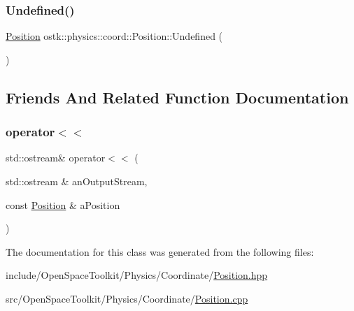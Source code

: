 \mbox{\label{classostk_1_1physics_1_1coord_1_1_position_a9d9c2e5b2a72f978192eb9e3a7ce7d8b}} 
\subsubsection{\texorpdfstring{Undefined()}{Undefined()}}
{\footnotesize\ttfamily \hyperlink{classostk_1_1physics_1_1coord_1_1_position}{Position} ostk\+::physics\+::coord\+::\+Position\+::\+Undefined (\begin{DoxyParamCaption}{ }\end{DoxyParamCaption})\hspace{0.3cm}{\ttfamily [static]}}



\subsection{Friends And Related Function Documentation}
\mbox{\label{classostk_1_1physics_1_1coord_1_1_position_aab9f362c268370239ccad2c8a6d0eaee}} 
\subsubsection{\texorpdfstring{operator$<$$<$}{operator<<}}
{\footnotesize\ttfamily std\+::ostream\& operator$<$$<$ (\begin{DoxyParamCaption}\item[{std\+::ostream \&}]{an\+Output\+Stream,  }\item[{const \hyperlink{classostk_1_1physics_1_1coord_1_1_position}{Position} \&}]{a\+Position }\end{DoxyParamCaption})\hspace{0.3cm}{\ttfamily [friend]}}



The documentation for this class was generated from the following files\+:\begin{DoxyCompactItemize}
\item 
include/\+Open\+Space\+Toolkit/\+Physics/\+Coordinate/\hyperlink{_position_8hpp}{Position.\+hpp}\item 
src/\+Open\+Space\+Toolkit/\+Physics/\+Coordinate/\hyperlink{_position_8cpp}{Position.\+cpp}\end{DoxyCompactItemize}

